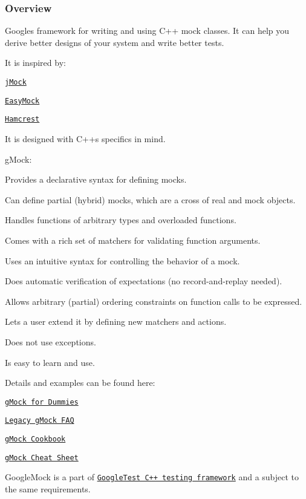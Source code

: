 \subsubsection*{Overview}

Google\textquotesingle{}s framework for writing and using C++ mock classes. It can help you derive better designs of your system and write better tests.

It is inspired by\+:


\begin{DoxyItemize}
\item \href{http://www.jmock.org/}{\tt j\+Mock}
\item \href{https://easymock.org/}{\tt Easy\+Mock}
\item \href{https://code.google.com/p/hamcrest/}{\tt Hamcrest}
\end{DoxyItemize}

It is designed with C++\textquotesingle{}s specifics in mind.

g\+Mock\+:


\begin{DoxyItemize}
\item Provides a declarative syntax for defining mocks.
\item Can define partial (hybrid) mocks, which are a cross of real and mock objects.
\item Handles functions of arbitrary types and overloaded functions.
\item Comes with a rich set of matchers for validating function arguments.
\item Uses an intuitive syntax for controlling the behavior of a mock.
\item Does automatic verification of expectations (no record-\/and-\/replay needed).
\item Allows arbitrary (partial) ordering constraints on function calls to be expressed.
\item Lets a user extend it by defining new matchers and actions.
\item Does not use exceptions.
\item Is easy to learn and use.
\end{DoxyItemize}

Details and examples can be found here\+:


\begin{DoxyItemize}
\item \href{https://google.github.io/googletest/gmock_for_dummies.html}{\tt g\+Mock for Dummies}
\item \href{https://google.github.io/googletest/gmock_faq.html}{\tt Legacy g\+Mock F\+AQ}
\item \href{https://google.github.io/googletest/gmock_cook_book.html}{\tt g\+Mock Cookbook}
\item \href{https://google.github.io/googletest/gmock_cheat_sheet.html}{\tt g\+Mock Cheat Sheet}
\end{DoxyItemize}

Google\+Mock is a part of \href{https://github.com/google/googletest/}{\tt Google\+Test C++ testing framework} and a subject to the same requirements. 